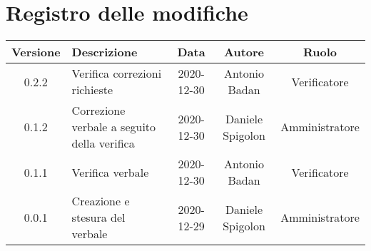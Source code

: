 \section*{Registro delle modifiche}

\begin{center}
	\begin{longtable}{|c|p{5cm}|c|c|c|}
	\hline
	\rowcolor{lighter-grayer}
	\textbf{Versione} & \textbf{Descrizione} & \textbf{Data} & \textbf{Autore} & \textbf{Ruolo} \\
	\hline
	\endfirsthead

	0.2.2 & Verifica correzioni richieste & 2020-12-30 & Antonio Badan & Verificatore \\
	\hline
	0.1.2 & Correzione verbale a seguito della verifica & 2020-12-30 & Daniele Spigolon & Amministratore \\
	\hline
	0.1.1 & Verifica verbale & 2020-12-30 & Antonio Badan & Verificatore \\
	\hline
	0.0.1 & Creazione e stesura del verbale & 2020-12-29 & Daniele Spigolon & Amministratore \\
	\hline
	\end{longtable}
\end{center}